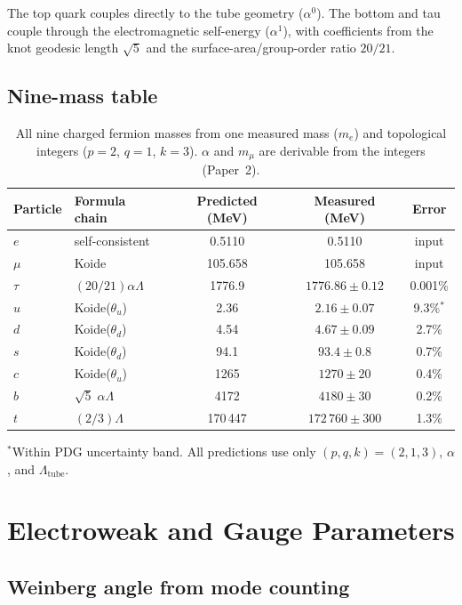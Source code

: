 \documentclass[11pt,a4paper]{article}
\begin{document}
The top quark couples directly to the tube geometry ($\alpha^0$). The bottom and tau couple through the electromagnetic self-energy ($\alpha^1$), with coefficients from the knot geodesic length $\sqrt{5}$ and the surface-area/group-order ratio $20/21$.

\subsection{Nine-mass table}

\begin{table}[h]
\centering
\caption{All nine charged fermion masses from one measured mass ($m_e$) and topological integers ($p=2$, $q=1$, $k=3$). $\alpha$ and $m_\mu$ are derivable from the integers (Paper~2).}
\label{tab:nine-masses}
\begin{tabular}{@{}llccc@{}}
\toprule
Particle & Formula chain & Predicted (MeV) & Measured (MeV) & Error \\
\midrule
$e$ & self-consistent & 0.5110 & 0.5110 & input \\
$\mu$ & Koide & 105.658 & 105.658 & input \\
$\tau$ & $(20/21)\alpha\Lambda$ & 1776.9 & $1776.86 \pm 0.12$ & 0.001\% \\
$u$ & Koide($\theta_u$) & 2.36 & $2.16 \pm 0.07$ & 9.3\%$^*$ \\
$d$ & Koide($\theta_d$) & 4.54 & $4.67 \pm 0.09$ & 2.7\% \\
$s$ & Koide($\theta_d$) & 94.1 & $93.4 \pm 0.8$ & 0.7\% \\
$c$ & Koide($\theta_u$) & 1265 & $1270 \pm 20$ & 0.4\% \\
$b$ & $\sqrt{5}\;\alpha\Lambda$ & 4172 & $4180 \pm 30$ & 0.2\% \\
$t$ & $(2/3)\Lambda$ & 170\,447 & $172\,760 \pm 300$ & 1.3\% \\
\bottomrule
\end{tabular}

\medskip
\small $^*$Within PDG uncertainty band. All predictions use only $(p,q,k) = (2,1,3)$, $\alpha$, and $\Lambda_{\text{tube}}$.
\end{table}

\section{Electroweak and Gauge Parameters}
\label{sec:electroweak}

\subsection{Weinberg angle from mode counting}
\end{document}
